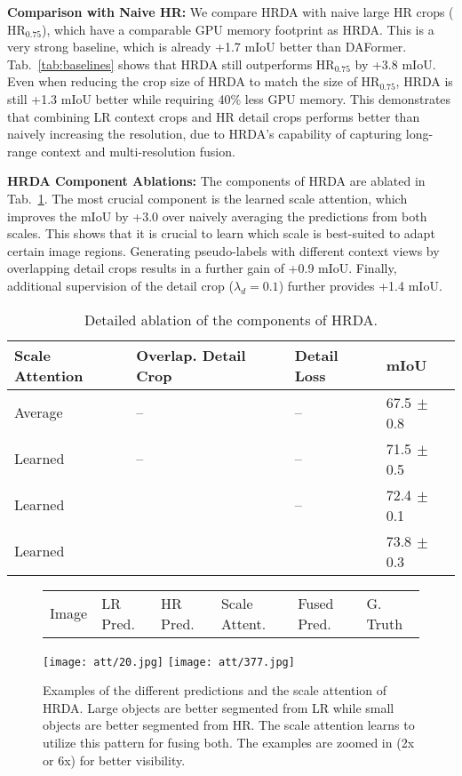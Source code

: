 \documentclass[journal,compsoc]{IEEEtran}
\newcommand*{\cm}{\checkmark}
\newcommand{\spm}[1]{\tiny{$\,\pm$#1}}
\begin{document}
\noindent\textbf{Comparison with Naive HR:} We compare HRDA with naive large HR crops ($\text{HR}_{0.75}$), which have a comparable GPU memory footprint as HRDA. This is a very strong baseline, which is already +1.7 mIoU better than DAFormer. Tab.~\ref{tab:baselines} shows that HRDA still outperforms $\text{HR}_{0.75}$ by +3.8 mIoU. Even when reducing the crop size of HRDA to match the size of $\text{HR}_{0.75}$, HRDA is still +1.3 mIoU better while requiring 40\% less GPU memory. This demonstrates that combining LR context crops and HR detail crops performs better than naively increasing the resolution, due to HRDA's capability of capturing long-range context and multi-resolution fusion.

\noindent\textbf{HRDA Component Ablations:}
The components of HRDA are ablated in Tab.~\ref{tab:ablations}.
The most crucial component is the learned scale attention, which improves the mIoU by +3.0 over naively averaging the predictions from both scales.
This shows that it is crucial to learn which scale is best-suited to adapt certain image regions. Generating pseudo-labels with different context views by overlapping detail crops results in a further gain of +0.9 mIoU. Finally, additional supervision of the detail crop ($\lambda_d=0.1$) further provides +1.4 mIoU.

\begin{table}[tb]
\centering
\caption{Detailed ablation of the components of HRDA.}
\label{tab:ablations}
\setlength{\tabcolsep}{3pt}
\footnotesize
\begin{tabular}{llll}
\toprule
Scale Attention & Overlap. Detail Crop & Detail Loss &           mIoU \\
\midrule
Average &                 -- &          -- & 67.5\spm{0.8} \\
Learned &                 -- &          -- & 71.5\spm{0.5} \\
Learned &                \cm &          -- & 72.4\spm{0.1} \\
Learned &                \cm &         \cm & 73.8\spm{0.3} \\
\bottomrule
\end{tabular}
\end{table} 
\begin{figure*}[tb]
\centering
\begin{minipage}{0.8\linewidth}
{\footnotesize
\begin{tabularx}{\linewidth}{*{6}{Y}}
Image & LR Pred. & HR Pred. & Scale Attent. & Fused Pred. & G. Truth \\
\end{tabularx}
} %
\texttt{[image: att/20.jpg]}
\texttt{[image: att/377.jpg]}
\end{minipage}
\caption{Examples of the different predictions and the scale attention of HRDA. Large objects are better segmented from LR while small objects are better segmented from HR. The scale attention learns to utilize this pattern for fusing both. The examples are zoomed in (2x or 6x) for better visibility.}
\label{fig:attention_examples}
\end{figure*}
\end{document}
